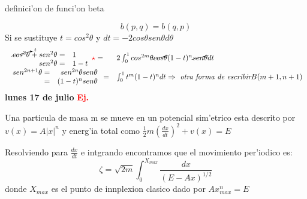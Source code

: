 \documentclass{article}
\theoremstyle{definition}
\begin{document}
\begin{center}
\fbox{\begin{minipage}{15em}
  \[b(p,q)=\frac{\Gamma (q)\Gamma (p)}{\Gamma (q+p)}\]
\end{minipage}} definici'on de funci'on beta
\end{center}
\[b(p,q)=b(q,p)\]
Si se sustituye $t=cos^2\theta$ y $dt=-2cos\theta sen\theta d\theta$
\[
\begin{array}{ll}
	\begin{array}{rl}
		\cancelto{t}{cos^2\theta}+sen^2\theta=&1\\
		sen^2\theta =&1-t
	\end{array} \textcolor{red}{\star}= & 2\int^{1}_0 cos^{2m}\theta\cancel{cos\theta} (1-t)^n\cancel{sen\theta}dt\\
	\begin{array}{rr}
		sen^{2n+1}\theta=&sen^{2n}\theta sen\theta\\
		=&(1-t)^n sen\theta
	\end{array} = & \int^{1}_0 t^m (1-t)^n dt\Rightarrow \textit{ otra forma de escribir} B(m+1,n+1)
\end{array}
\]
\newpage
\textbf{lunes 17 de julio}
\textbf{\textcolor{red}{Ej.}}

Una particula de masa m se mueve en un potencial sim'etrico esta descrito por $v(x)=A|x|^n$ y energ'ia total como $\frac{1}{2}m\left(\frac{dx}{dt}\right)^2 +v(x)=E$

Resolviendo para $\frac{dx}{dt}$ e intgrando encontramos que el movimiento per'iodico es:
\[\zeta=\sqrt{2m}\int^{X_{max}}_0 \frac{dx}{(E-Ax)^{1/2}}\]
donde $X_{max}$ es el punto de innplexion clasico dado por $Ax_{max}^n=E$
\end{document}

